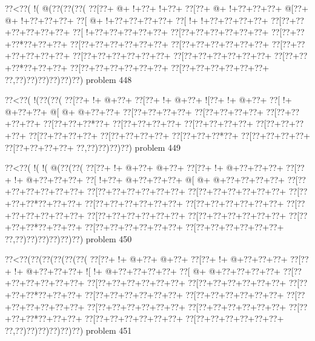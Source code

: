 \vbox{\vbox{\goo
\0??<\0??(\- !(\- @(\0??(\0??(\0??(
\0??[\0??+\- @+\- !+\0??+\- !+\0??+
\0??[\0??+\- @+\- !+\0??+\0??+\0??+
\- @[\0??+\- @+\- !+\0??+\0??+\0??+
\0??[\- @+\- !+\0??+\0??+\0??+\0??+
\0??[\- !+\- !+\0??+\0??+\0??+\0??+
\0??[\0??+\0??+\0??+\0??+\0??+\0??+
\0??[\- !+\0??+\0??+\0??+\0??+\0??+
\0??[\0??+\0??+\0??+\0??+\0??+\0??+
\0??[\0??+\0??+\0??*\0??+\0??+\0??+
\0??[\0??+\0??+\0??+\0??+\0??+\0??+
\0??[\0??+\0??+\0??+\0??+\0??+\0??+
\0??[\0??+\0??+\0??+\0??+\0??+\0??+
\0??[\0??+\0??+\0??+\0??+\0??+\0??+
\0??[\0??+\0??+\0??+\0??+\0??+\0??+
\0??[\0??+\0??+\0??*\0??+\0??+\0??+
\0??[\0??+\0??+\0??+\0??+\0??+\0??+
\0??[\0??+\0??+\0??+\0??+\0??+\0??+
\0??,\0??)\0??)\0??)\0??)\0??)\0??)
}
\hfil problem 448\hfil\break
}

\vbox{\vbox{\goo
\0??<\0??(\- !(\0??(\0??(
\0??[\0??+\- !+\- @+\0??+
\0??[\0??+\- !+\- @+\0??+
\- ![\0??+\- !+\- @+\0??+
\0??[\- !+\- @+\0??+\0??+
\- @[\- @+\- @+\0??+\0??+
\0??[\0??+\0??+\0??+\0??+
\0??[\0??+\0??+\0??+\0??+
\0??[\0??+\0??+\0??+\0??+
\0??[\0??+\0??+\0??*\0??+
\0??[\0??+\0??+\0??+\0??+
\0??[\0??+\0??+\0??+\0??+
\0??[\0??+\0??+\0??+\0??+
\0??[\0??+\0??+\0??+\0??+
\0??[\0??+\0??+\0??+\0??+
\0??[\0??+\0??+\0??*\0??+
\0??[\0??+\0??+\0??+\0??+
\0??[\0??+\0??+\0??+\0??+
\0??,\0??)\0??)\0??)\0??)
}
\hfil problem 449\hfil\break
}

\vbox{\vbox{\goo
\0??<\0??(\- !(\- !(\- @(\0??(\0??(
\0??[\0??+\- !+\- @+\0??+\- @+\0??+
\0??[\0??+\- !+\- @+\0??+\0??+\0??+
\0??[\0??+\- !+\- @+\0??+\0??+\0??+
\0??[\- !+\0??+\- @+\0??+\0??+\0??+
\- @[\- @+\- @+\0??+\0??+\0??+\0??+
\0??[\0??+\0??+\0??+\0??+\0??+\0??+
\0??[\0??+\0??+\0??+\0??+\0??+\0??+
\0??[\0??+\0??+\0??+\0??+\0??+\0??+
\0??[\0??+\0??+\0??*\0??+\0??+\0??+
\0??[\0??+\0??+\0??+\0??+\0??+\0??+
\0??[\0??+\0??+\0??+\0??+\0??+\0??+
\0??[\0??+\0??+\0??+\0??+\0??+\0??+
\0??[\0??+\0??+\0??+\0??+\0??+\0??+
\0??[\0??+\0??+\0??+\0??+\0??+\0??+
\0??[\0??+\0??+\0??*\0??+\0??+\0??+
\0??[\0??+\0??+\0??+\0??+\0??+\0??+
\0??[\0??+\0??+\0??+\0??+\0??+\0??+
\0??,\0??)\0??)\0??)\0??)\0??)\0??)
}
\hfil problem 450\hfil\break
}

\vbox{\vbox{\goo
\0??<\0??(\0??(\0??(\0??(\0??(\0??(
\0??[\0??+\- !+\- @+\0??+\- @+\0??+
\0??[\0??+\- !+\- @+\0??+\0??+\0??+
\0??[\0??+\- !+\- @+\0??+\0??+\0??+
\- ![\- !+\- @+\0??+\0??+\0??+\0??+
\0??[\- @+\- @+\0??+\0??+\0??+\0??+
\0??[\0??+\0??+\0??+\0??+\0??+\0??+
\0??[\0??+\0??+\0??+\0??+\0??+\0??+
\0??[\0??+\0??+\0??+\0??+\0??+\0??+
\0??[\0??+\0??+\0??*\0??+\0??+\0??+
\0??[\0??+\0??+\0??+\0??+\0??+\0??+
\0??[\0??+\0??+\0??+\0??+\0??+\0??+
\0??[\0??+\0??+\0??+\0??+\0??+\0??+
\0??[\0??+\0??+\0??+\0??+\0??+\0??+
\0??[\0??+\0??+\0??+\0??+\0??+\0??+
\0??[\0??+\0??+\0??*\0??+\0??+\0??+
\0??[\0??+\0??+\0??+\0??+\0??+\0??+
\0??[\0??+\0??+\0??+\0??+\0??+\0??+
\0??,\0??)\0??)\0??)\0??)\0??)\0??)
}
\hfil problem 451\hfil\break
}

